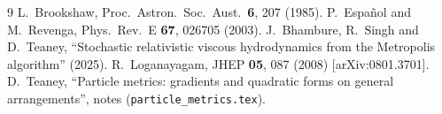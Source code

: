 \documentclass[11pt,aps,preprint,nofootinbib,superscriptaddress,tightenlines]{revtex4-2}
\begin{document}
\begin{thebibliography}{9}
 L.~Brookshaw, Proc.\ Astron.\ Soc.\ Aust.\ \textbf{6}, 207 (1985).
 P.~Español and M.~Revenga, Phys.\ Rev.\ E \textbf{67}, 026705 (2003).
 J.~Bhambure, R.~Singh and D.~Teaney, ``Stochastic relativistic viscous hydrodynamics from the Metropolis algorithm'' (2025).
 R.~Loganayagam, JHEP \textbf{05}, 087 (2008) [arXiv:0801.3701].
 D.~Teaney, ``Particle metrics: gradients and quadratic forms on general arrangements'', notes (\texttt{particle\_metrics.tex}).
\end{thebibliography}
\end{document}
